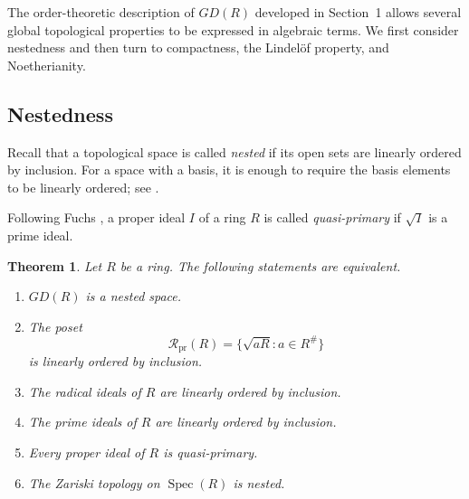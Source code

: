 \documentclass[11pt]{amsart}
\theoremstyle{plain}
\newtheorem{theorem}{Theorem}[section]
\theoremstyle{definition}
\theoremstyle{remark}
\numberwithin{equation}{section}
\begin{document}
The order-theoretic description of $GD(R)$ developed in Section~1
allows several global topological properties to be expressed in
algebraic terms. We first consider nestedness and then turn to
compactness, the Lindel\"of property, and Noetherianity.


\subsection{Nestedness}

Recall that a topological space is called \emph{nested} if its open
sets are linearly ordered by inclusion. For a space with a basis, it is
enough to require the basis elements to be linearly ordered; see
\cite[Lemma 1]{YigitKoc}.

Following Fuchs \cite{FuchsQuasiPrimary}, a proper ideal $I$ of a ring
$R$ is called \emph{quasi-primary} if $\sqrt{I}$ is a prime ideal.

\begin{theorem}\label{thm:nested}
	Let $R$ be a ring. The following statements are equivalent.
	\begin{enumerate}
		\item $GD(R)$ is a nested space.
		
		\item The poset
		\[
		\mathcal R_{\mathrm{pr}}(R)
		=
		\{\sqrt{aR}:a\in R^\#\}
		\]
		is linearly ordered by inclusion.
		
		\item The radical ideals of $R$ are linearly ordered by inclusion.
		
		\item The prime ideals of $R$ are linearly ordered by inclusion.
		
		\item Every proper ideal of $R$ is quasi-primary.
		
		\item The Zariski topology on $\operatorname{Spec}(R)$ is nested.
	\end{enumerate}
\end{theorem}
\end{document}

